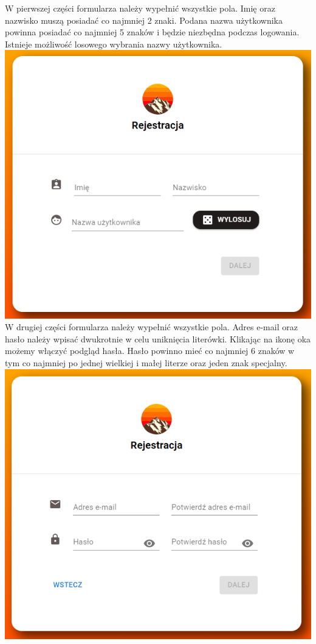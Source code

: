 \documentclass[12pt]{article}
\begin{document}
\begin{flushleft}
\begin{itemize}
			W pierwszej części formularza należy wypełnić wszystkie pola. Imię oraz nazwisko muszą posiadać co najmniej 2 znaki. Podana nazwa użytkownika powinna posiadać co najmniej 5 znaków i będzie niezbędna podczas logowania. Istnieje możliwość losowego wybrania nazwy użytkownika. \linebreak
			\includegraphics[scale=0.7]{Rejestracja2.png} \linebreak
			W drugiej części formularza należy wypełnić wszystkie pola. Adres e-mail oraz hasło należy wpisać dwukrotnie w celu uniknięcia literówki. Klikając na ikonę oka możemy włączyć podgląd hasła. Hasło powinno mieć co najmniej 6 znaków w tym co najmniej po jednej wielkiej i małej literze oraz jeden znak specjalny.\linebreak
			\includegraphics[scale=0.7]{Rejestracja3.png} \linebreak

\end{itemize}
\end{flushleft}
\end{document}
